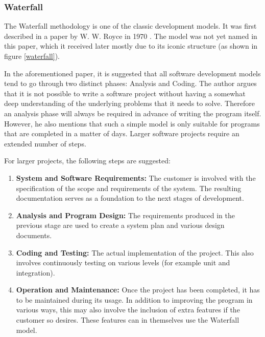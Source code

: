 \subsubsection{Waterfall}

The Waterfall methodology is one of the classic development models. It was first described in a paper by W. W. Royce in 1970 \cite{waterfall}.  The model was not yet named in this paper, which it received later mostly due to its iconic structure (as shown in figure \ref{waterfall}).

In the aforementioned paper, it is suggested that all software development models tend to go through two distinct phases: Analysis and Coding. The author argues that it is not possible to write a software project without having a somewhat deep understanding of the underlying problems that it needs to solve. Therefore an analysis phase will always be required in advance of writing the program itself. However, he also mentions that such a simple model is only suitable for programs that are completed in a matter of days. Larger software projects require an extended number of steps.

For larger projects, the following steps are suggested:
\begin{enumerate}
	\item \textbf{System and Software Requirements:} The customer is involved with the specification of the scope and requirements of the system. The resulting documentation serves as a foundation to the next stages of development.
	\item \textbf{Analysis and Program Design:} The requirements produced in the previous stage are used to create a system plan and various design documents.
	\item \textbf{Coding and Testing:} The actual implementation of the project. This also involves continuously testing on various levels (for example unit and integration).
	\item \textbf{Operation and Maintenance:} Once the project has been completed, it has to be maintained during its usage. In addition to improving the program in various ways, this may also involve the inclusion of extra features if the customer so desires. These features can in themselves use the Waterfall model.
\end{enumerate}


